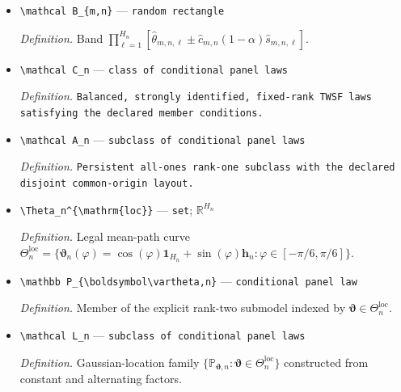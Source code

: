 \documentclass{article}
\begin{document}
\begin{itemize}
  \par\smallskip\noindent\emph{Definition.} Conditional \((1-\alpha)\)-quantile of \(\max_{\ell\le H_n}|N(0,\widehat R_{m,n})_\ell|\).
  \item \texttt{\textbackslash{}\allowbreak{}mathcal B\_\allowbreak{}\{m,\allowbreak{}n\}\allowbreak{}} --- \texttt{random rectangle}
  \par\smallskip\noindent\emph{Definition.} Band \(\prod_{\ell=1}^{H_n}[\widehat\theta_{m,n,\ell}\pm\widehat c_{m,n}(1-\alpha)\widehat s_{m,n,\ell}]\).
  \item \texttt{\textbackslash{}\allowbreak{}mathcal C\_\allowbreak{}n} --- \texttt{class of conditional panel laws}
  \par\smallskip\noindent\emph{Definition.} \texttt{Balanced,\allowbreak{} strongly identified,\allowbreak{} fixed-\allowbreak{}rank TWSF laws satisfying the declared member conditions.}
  \item \texttt{\textbackslash{}\allowbreak{}mathcal A\_\allowbreak{}n} --- \texttt{subclass of conditional panel laws}
  \par\smallskip\noindent\emph{Definition.} \texttt{Persistent all-\allowbreak{}ones rank-\allowbreak{}one subclass with the declared disjoint common-\allowbreak{}origin layout.}
  \item \texttt{\textbackslash{}\allowbreak{}Theta\_\allowbreak{}n\textasciicircum{}\{\textbackslash{}\allowbreak{}mathrm\{loc\}\allowbreak{}\}\allowbreak{}} --- \texttt{set}; \(\mathbb R^{H_n}\)
  \par\smallskip\noindent\emph{Definition.} Legal mean-path curve \(\Theta_n^{\mathrm{loc}}=\{\boldsymbol\vartheta_n(\varphi)=\cos(\varphi)\boldsymbol 1_{H_n}+\sin(\varphi)\boldsymbol h_n:\varphi\in[-\pi/6,\pi/6]\}\).
  \item \texttt{\textbackslash{}\allowbreak{}mathbb P\_\allowbreak{}\{\textbackslash{}\allowbreak{}boldsymbol\textbackslash{}\allowbreak{}vartheta,\allowbreak{}n\}\allowbreak{}} --- \texttt{conditional panel law}
  \par\smallskip\noindent\emph{Definition.} Member of the explicit rank-two submodel indexed by \(\boldsymbol\vartheta\in\Theta_n^{\mathrm{loc}}\).
  \item \texttt{\textbackslash{}\allowbreak{}mathcal L\_\allowbreak{}n} --- \texttt{subclass of conditional panel laws}
  \par\smallskip\noindent\emph{Definition.} Gaussian-location family \(\{\mathbb P_{\boldsymbol\vartheta,n}:\boldsymbol\vartheta\in\Theta_n^{\mathrm{loc}}\}\) constructed from constant and alternating factors.

\end{itemize}
\end{document}
